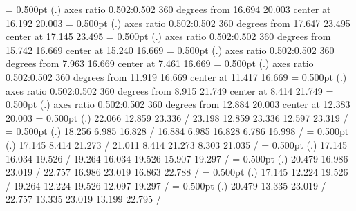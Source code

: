 %
%
\linethickness= 0.500pt
\setplotsymbol ({\thinlinefont .})
\ellipticalarc axes ratio  0.502:0.502  360 degrees 
        from 16.694 20.003 center at 16.192 20.003
%
%
\linethickness= 0.500pt
\setplotsymbol ({\thinlinefont .})
\ellipticalarc axes ratio  0.502:0.502  360 degrees 
        from 17.647 23.495 center at 17.145 23.495
%
%
\linethickness= 0.500pt
\setplotsymbol ({\thinlinefont .})
\ellipticalarc axes ratio  0.502:0.502  360 degrees 
        from 15.742 16.669 center at 15.240 16.669
%
%
\linethickness= 0.500pt
\setplotsymbol ({\thinlinefont .})
\ellipticalarc axes ratio  0.502:0.502  360 degrees 
        from  7.963 16.669 center at  7.461 16.669
%
%
\linethickness= 0.500pt
\setplotsymbol ({\thinlinefont .})
\ellipticalarc axes ratio  0.502:0.502  360 degrees 
        from 11.919 16.669 center at 11.417 16.669
%
%
\linethickness= 0.500pt
\setplotsymbol ({\thinlinefont .})
\ellipticalarc axes ratio  0.502:0.502  360 degrees 
        from  8.915 21.749 center at  8.414 21.749
%
%
\linethickness= 0.500pt
\setplotsymbol ({\thinlinefont .})
\ellipticalarc axes ratio  0.502:0.502  360 degrees 
        from 12.884 20.003 center at 12.383 20.003
\fi  %
%
%
\linethickness= 0.500pt
\setplotsymbol ({\thinlinefont .})
 22.066 12.859 23.336 /
%
%
 23.198 12.859 23.336 12.597 23.319 /
%
%
%
\linethickness= 0.500pt
\setplotsymbol ({\thinlinefont .})
 18.256  6.985 16.828 /
%
%
 16.884  6.985 16.828  6.786 16.998 /
%
%
%
\linethickness= 0.500pt
\setplotsymbol ({\thinlinefont .})
 17.145  8.414 21.273 /
%
%
 21.011  8.414 21.273  8.303 21.035 /
%
%
%
\linethickness= 0.500pt
\setplotsymbol ({\thinlinefont .})
 17.145 16.034 19.526 /
%
%
 19.264 16.034 19.526 15.907 19.297 /
%
%
%
\linethickness= 0.500pt
\setplotsymbol ({\thinlinefont .})
 20.479 16.986 23.019 /
%
%
 22.757 16.986 23.019 16.863 22.788 /
%
%
%
\linethickness= 0.500pt
\setplotsymbol ({\thinlinefont .})
 17.145 12.224 19.526 /
%
%
 19.264 12.224 19.526 12.097 19.297 /
%
%
%
\linethickness= 0.500pt
\setplotsymbol ({\thinlinefont .})
 20.479 13.335 23.019 /
%
%
 22.757 13.335 23.019 13.199 22.795 /
